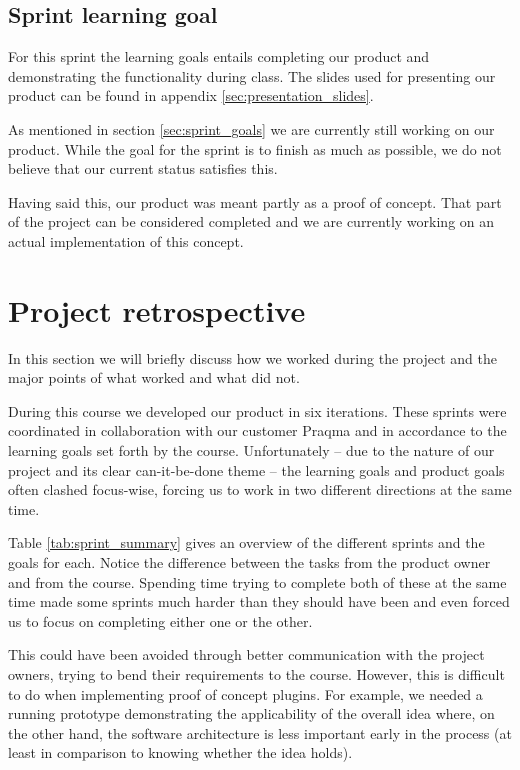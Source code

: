 \documentclass[a4paper,11pt]{article}
\begin{document}
\subsection{Sprint learning goal}
\label{sec:sprint_learning_goals}

For this sprint the learning goals entails completing our product and
demonstrating the functionality during class. The slides used for presenting our
product can be found in appendix \ref{sec:presentation_slides}.

As mentioned in section \ref{sec:sprint_goals} we are currently still working on
our product. While the goal for the sprint is to finish as much as possible, we
do not believe that our current status satisfies this.

Having said this, our product was meant partly as a proof of concept. That part
of the project can be considered completed and we are currently working on an
actual implementation of this concept. 

\section{Project retrospective}
\label{sec:project_retrospective}

In this section we will briefly discuss how we worked during the project and the
major points of what worked and what did not.

During this course we developed our product in six iterations. These sprints
were coordinated in collaboration with our customer Praqma and in accordance to
the learning goals set forth by the course. Unfortunately -- due to the nature
of our project and its clear can-it-be-done theme -- the learning goals and
product goals often clashed focus-wise, forcing us to work in two different
directions at the same time. 

Table \ref{tab:sprint_summary} gives an overview of the different sprints and
the goals for each. Notice the difference between the tasks from the product
owner and from the course. Spending time trying to complete both of these at the
same time made some sprints much harder than they should have been and even forced us
to focus on completing either one or the other. 

This could have been avoided through better communication with the project
owners, trying to bend their requirements to the course. However, this is
difficult to do when implementing proof of concept plugins. For example, we
needed a running prototype demonstrating the applicability of the overall idea
where, on the other hand, the software architecture is less important early in
the process (at least in comparison to knowing whether the idea holds).
\end{document}
